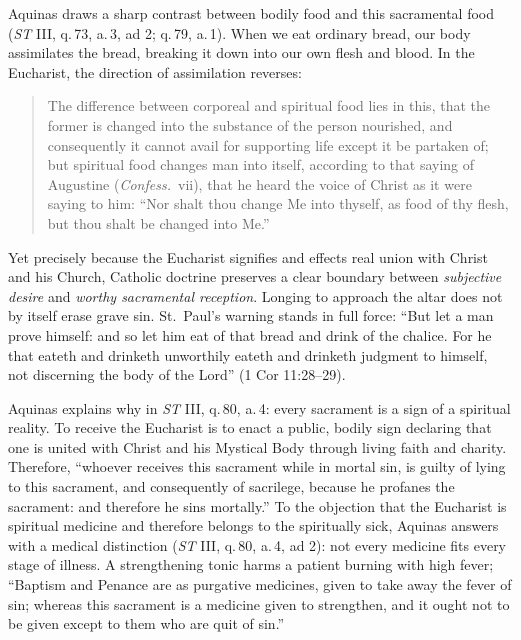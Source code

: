 Aquinas draws a sharp contrast between bodily food and this sacramental food (\emph{ST} III, q.\,73, a.\,3, ad 2; q.\,79, a.\,1). When we eat ordinary bread, our body assimilates the bread, breaking it down into our own flesh and blood. In the Eucharist, the direction of assimilation reverses:

\begin{quote}
The difference between corporeal and spiritual food lies in this, that the former is changed into the substance of the person nourished, and consequently it cannot avail for supporting life except it be partaken of; but spiritual food changes man into itself, according to that saying of Augustine (\emph{Confess.}\ vii), that he heard the voice of Christ as it were saying to him: ``Nor shalt thou change Me into thyself, as food of thy flesh, but thou shalt be changed into Me.''
\end{quote}

Yet precisely because the Eucharist signifies and effects real union with Christ and his Church, Catholic doctrine preserves a clear boundary between \emph{subjective desire} and \emph{worthy sacramental reception}. Longing to approach the altar does not by itself erase grave sin. St.\ Paul's warning stands in full force: ``But let a man prove himself: and so let him eat of that bread and drink of the chalice. For he that eateth and drinketh unworthily eateth and drinketh judgment to himself, not discerning the body of the Lord'' (1 Cor 11:28--29).

Aquinas explains why in \emph{ST} III, q.\,80, a.\,4: every sacrament is a sign of a spiritual reality. To receive the Eucharist is to enact a public, bodily sign declaring that one is united with Christ and his Mystical Body through living faith and charity. Therefore, ``whoever receives this sacrament while in mortal sin, is guilty of lying to this sacrament, and consequently of sacrilege, because he profanes the sacrament: and therefore he sins mortally.'' To the objection that the Eucharist is spiritual medicine and therefore belongs to the spiritually sick, Aquinas answers with a medical distinction (\emph{ST} III, q.\,80, a.\,4, ad 2): not every medicine fits every stage of illness. A strengthening tonic harms a patient burning with high fever; ``Baptism and Penance are as purgative medicines, given to take away the fever of sin; whereas this sacrament is a medicine given to strengthen, and it ought not to be given except to them who are quit of sin.''

